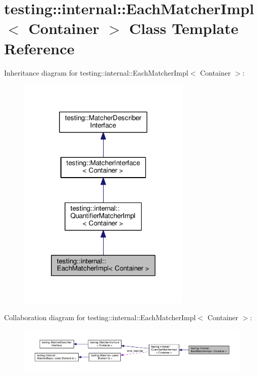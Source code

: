 \hypertarget{classtesting_1_1internal_1_1EachMatcherImpl}{}\section{testing\+:\+:internal\+:\+:Each\+Matcher\+Impl$<$ Container $>$ Class Template Reference}
\label{classtesting_1_1internal_1_1EachMatcherImpl}


Inheritance diagram for testing\+:\+:internal\+:\+:Each\+Matcher\+Impl$<$ Container $>$\+:\nopagebreak
\begin{figure}[H]
\begin{center}
\leavevmode
\includegraphics[width=233pt]{classtesting_1_1internal_1_1EachMatcherImpl__inherit__graph}
\end{center}
\end{figure}


Collaboration diagram for testing\+:\+:internal\+:\+:Each\+Matcher\+Impl$<$ Container $>$\+:\nopagebreak
\begin{figure}[H]
\begin{center}
\leavevmode
\includegraphics[width=350pt]{classtesting_1_1internal_1_1EachMatcherImpl__coll__graph}
\end{center}
\end{figure}

